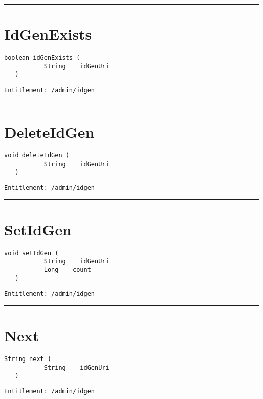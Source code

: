 \rule{12cm}{2pt}
\section{IdGenExists}
\label{Api:IdGenExists}
\begin{lstlisting}[style=nonumbers]
   boolean idGenExists (
           String    idGenUri
   )
\end{lstlisting}
\begin{Verbatim}[formatcom=\color{Maroon}]
  Entitlement: /admin/idgen
\end{Verbatim}



\rule{12cm}{2pt}
\section{DeleteIdGen}
\label{Api:DeleteIdGen}
\begin{lstlisting}[style=nonumbers]
   void deleteIdGen (
           String    idGenUri
   )
\end{lstlisting}
\begin{Verbatim}[formatcom=\color{Maroon}]
  Entitlement: /admin/idgen
\end{Verbatim}



\rule{12cm}{2pt}
\section{SetIdGen}
\label{Api:SetIdGen}
\begin{lstlisting}[style=nonumbers]
   void setIdGen (
           String    idGenUri
           Long    count
   )
\end{lstlisting}
\begin{Verbatim}[formatcom=\color{Maroon}]
  Entitlement: /admin/idgen
\end{Verbatim}



\rule{12cm}{2pt}
\section{Next}
\label{Api:Next}
\begin{lstlisting}[style=nonumbers]
   String next (
           String    idGenUri
   )
\end{lstlisting}
\begin{Verbatim}[formatcom=\color{Maroon}]
  Entitlement: /admin/idgen
\end{Verbatim}



